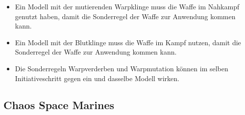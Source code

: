 \begin{itemize}
 \item Ein Modell mit der mutierenden Warpklinge muss die Waffe im Nahkampf
  genutzt haben, damit die Sonderregel der Waffe zur Anwendung kommen kann.

 \item Ein Modell mit der Blutklinge muss die Waffe im Kampf nutzen, damit die
  Sonderregel der Waffe zur Anwendung kommen kann.

 \item Die Sonderregeln Warpverderben und Warpmutation können im selben
  Initiativeschritt gegen ein und dasselbe Modell wirken.

\end{itemize}

\subsection{Chaos Space Marines}

